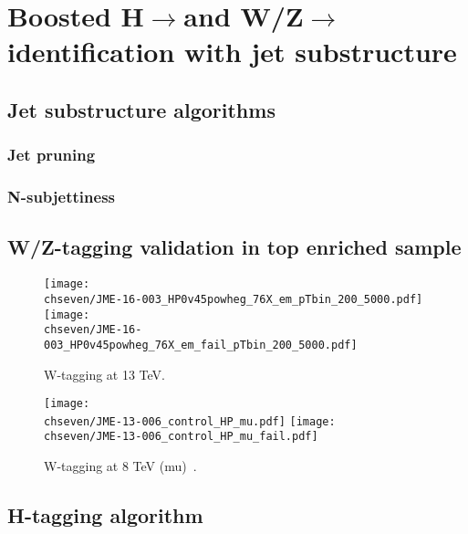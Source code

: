 \chapter{Boosted H$\rightarrow$\bbbar and W/Z$\rightarrow$\qqbarpr identification with jet substructure}

\section{Jet substructure algorithms}
\subsection{Jet pruning}
\subsection{N-subjettiness}

\section{W/Z-tagging validation in top enriched sample}

\begin{figure}[h]
 \begin{center}
   \texttt{[image: \\chseven/JME-16-003\_HP0v45powheg\_76X\_em\_pTbin\_200\_5000.pdf]}
  \texttt{[image: \\chseven/JME-16-003\_HP0v45powheg\_76X\_em\_fail\_pTbin\_200\_5000.pdf]}
 \end{center}
 \caption{W-tagging at 13 TeV. }
 \label{fig:wtagging-13TeV}
\end{figure}

\begin{figure}[h]
 \begin{center}
   \texttt{[image: \\chseven/JME-13-006\_control\_HP\_mu.pdf]}
  \texttt{[image: \\chseven/JME-13-006\_control\_HP\_mu\_fail.pdf]}
 \end{center}
 \caption{W-tagging at 8 TeV (mu)~\cite{Khachatryan:2014vla}.}
 \label{fig:wtagging-8TeV}
\end{figure}

\section{H-tagging algorithm}